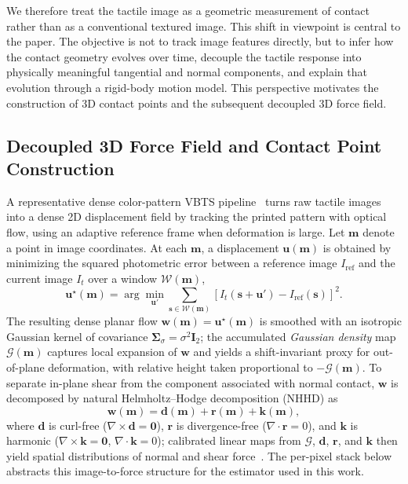 \documentclass[letterpaper,10pt,journal,twoside]{IEEEtran}
\begin{document}
We therefore treat the tactile image as a geometric measurement of contact rather than as a conventional textured image. This shift in viewpoint is central to the paper. The objective is not to track image features directly, but to infer how the contact geometry evolves over time, decouple the tactile response into physically meaningful tangential and normal components, and explain that evolution through a rigid-body motion model. This perspective motivates the construction of 3D contact points and the subsequent decoupled 3D force field.

\subsection{Decoupled 3D Force Field and Contact Point Construction}
\label{subsec:force_contact}

A representative dense color-pattern VBTS pipeline~\cite{zhang_deltact_2022} turns raw tactile images into a dense 2D displacement field by tracking the printed pattern with optical flow, using an adaptive reference frame when deformation is large.
Let $\mathbf{m}$ denote a point in image coordinates. At each $\mathbf{m}$, a displacement $\mathbf{u}(\mathbf{m})$ is obtained by minimizing the squared photometric error between a reference image $I_{\mathrm{ref}}$ and the current image $I_t$ over a window $\mathcal{W}(\mathbf{m})$,
\begin{equation}
\mathbf{u}^\star(\mathbf{m}) =
\arg\min_{\mathbf{u}'}
\sum_{\mathbf{s}\in\mathcal{W}(\mathbf{m})}
\left[
I_t\!\left(\mathbf{s}+\mathbf{u}'\right) - I_{\mathrm{ref}}(\mathbf{s})
\right]^2 .
\label{eq:dense_flow}
\end{equation}
The resulting dense planar flow $\mathbf{w}(\mathbf{m})=\mathbf{u}^\star(\mathbf{m})$ is smoothed with an isotropic Gaussian kernel of covariance $\boldsymbol{\Sigma}_{\sigma}=\sigma^2\mathbf{I}_2$; the accumulated \emph{Gaussian density} map $\mathcal{G}(\mathbf{m})$ captures local expansion of $\mathbf{w}$ and yields a shift-invariant proxy for out-of-plane deformation, with relative height taken proportional to $-\mathcal{G}(\mathbf{m})$.
To separate in-plane shear from the component associated with normal contact, $\mathbf{w}$ is decomposed by natural Helmholtz--Hodge decomposition (NHHD) as
\begin{equation}
\mathbf{w}(\mathbf{m}) =
\mathbf{d}(\mathbf{m}) + \mathbf{r}(\mathbf{m}) + \mathbf{k}(\mathbf{m}),
\label{eq:nhhd}
\end{equation}
where $\mathbf{d}$ is curl-free ($\nabla\times\mathbf{d}=\mathbf{0}$), $\mathbf{r}$ is divergence-free ($\nabla\cdot\mathbf{r}=0$), and $\mathbf{k}$ is harmonic ($\nabla\times\mathbf{k}=\mathbf{0}$, $\nabla\cdot\mathbf{k}=0$); calibrated linear maps from $\mathcal{G}$, $\mathbf{d}$, $\mathbf{r}$, and $\mathbf{k}$ then yield spatial distributions of normal and shear force~\cite{zhang_deltact_2022}.
The per-pixel stack below abstracts this image-to-force structure for the estimator used in this work.
\end{document}
